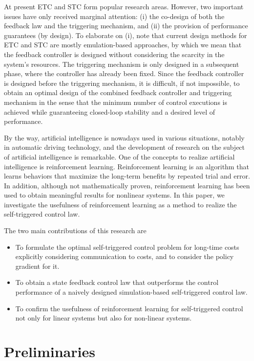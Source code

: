 \documentclass[english, dvipdfmx]{ampmt}             %
\begin{document}
At present ETC and STC form popular research areas. However, two important issues have only received marginal attention: (i) the co-design of both the feedback law and the triggering mechanism, and (ii) the provision of performance guarantees (by design). To elaborate on (i), note that current design methods for ETC and STC are mostly emulation-based approaches, by which we mean that the feedback controller is designed without considering the scarcity in the system’s resources. The triggering mechanism is only designed in a subsequent phase, where the controller has already been fixed. Since the feedback controller is designed before the triggering mechanism, it is difficult, if not impossible, to obtain an optimal design of the combined feedback controller and triggering mechanism in the sense that the minimum number of control executions is achieved while guaranteeing closed-loop stability and a desired level of performance. \par
By the way, artificial intelligence is nowadays used in various situations, notably in automatic driving technology, and the development of research on the subject of artificial intelligence is remarkable. One of the concepts to realize artificial intelligence is reinforcement learning. Reinforcement learning is an algorithm that learns behaviors that maximize the long-term benefits by repeated trial and error. In addition, although not mathematically proven, reinforcement learning has been used to obtain meaningful results for nonlinear systems. In this paper, we investigate the usefulness of reinforcement learning as a method to realize the self-triggered control law. \par
The two main contributions of this research are
\begin{itemize}
	\item To formulate the optimal self-triggered control problem for long-time costs explicitly considering communication to costs, and to consider the policy gradient for it.
	\item To obtain a state feedback control law that outperforms the control performance of a naively designed simulation-based self-triggered control law.
	\item To confirm the usefulness of reinforcement learning for self-triggered control not only for linear systems but also for non-linear systems.
\end{itemize}

\section{Preliminaries}
\end{document}
